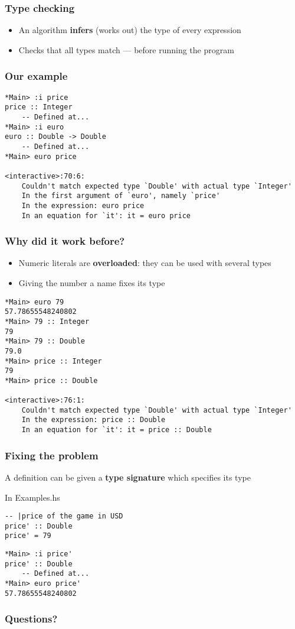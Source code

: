\documentclass{beamer}
\begin{document}
\begin{frame}
  \frametitle{Type checking}
  \begin{itemize}
  \item  An algorithm \textbf{infers} (works out) the type of every expression 
  \item  Checks that all types match --- before running the program
  \end{itemize}
\end{frame}
\begin{frame}[fragile]
  \frametitle{Our example}
\begin{verbatim}
*Main> :i price
price :: Integer
  	-- Defined at...
*Main> :i euro
euro :: Double -> Double
  	-- Defined at...
*Main> euro price

<interactive>:70:6:
    Couldn't match expected type `Double' with actual type `Integer'
    In the first argument of `euro', namely `price'
    In the expression: euro price
    In an equation for `it': it = euro price
\end{verbatim}
\end{frame}
\begin{frame}[fragile]
  \frametitle{Why did it work before?}
  \begin{itemize}
  \item Numeric literals are \textbf{overloaded}: they can be
    used with several types
  \item  Giving the number a name fixes its type
  \end{itemize}
\begin{verbatim}
*Main> euro 79
57.78655548240802
*Main> 79 :: Integer
79
*Main> 79 :: Double
79.0
*Main> price :: Integer
79
*Main> price :: Double

<interactive>:76:1:
    Couldn't match expected type `Double' with actual type `Integer'
    In the expression: price :: Double
    In an equation for `it': it = price :: Double
\end{verbatim}
\end{frame}
\begin{frame}[fragile]
  \frametitle{Fixing the problem}
  A definition can be given a \textbf{type signature} which specifies
  its type
\begin{block}{In Examples.hs}
\begin{lstlisting}
-- |price of the game in USD
price' :: Double
price' = 79
\end{lstlisting}
  \end{block}
\begin{verbatim}
*Main> :i price'
price' :: Double
  	-- Defined at...
*Main> euro price'
57.78655548240802
\end{verbatim}
\end{frame}


\begin{frame}
  \frametitle{Questions?}
  \begin{center}
  \end{center}
\end{frame}
\end{document}
